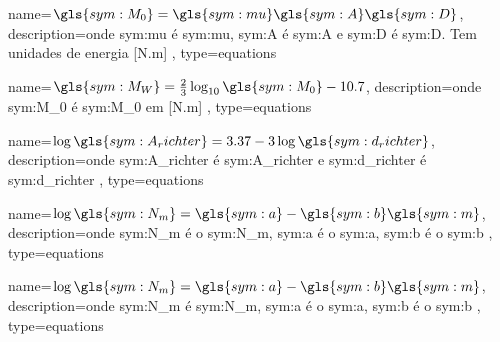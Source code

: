 
{
	name={\ensuremath{\gls{sym:M_0} = \gls{sym:mu}\gls{sym:A}\gls{sym:D}}},
	description={onde \gls{sym:mu} é \glsdesc{sym:mu}, 
				 \gls{sym:A} é \glsdesc{sym:A} e 
				 \gls{sym:D} é \glsdesc{sym:D}. 
				 Tem unidades de energia [N.m]
		 },
	type=equations
}

{
	name={\ensuremath{\gls{sym:M_W} = \frac{2}{3} \log_{10}{\gls{sym:M_0}} - 10.7 }},
	description={onde \gls{sym:M_0} é \glsdesc{sym:M_0} em [N.m]
		 },
	type=equations
}

{
	name={\ensuremath{\log{\gls{sym:A_richter}} = 3.37 - 3\log{\gls{sym:d_richter}}}},
	description={onde \gls{sym:A_richter} é \glsdesc{sym:A_richter} e 
					  \gls{sym:d_richter} é \glsdesc{sym:d_richter}
		 },
	type=equations
}

{
	name={\ensuremath{\log{\gls{sym:N_m}} = \gls{sym:a} - \gls{sym:b}\gls{sym:m} }},
	description={onde \gls{sym:N_m} é o \glsdesc{sym:N_m}, 
					  \gls{sym:a} é o \glsdesc{sym:a},
					  \gls{sym:b} é o \glsdesc{sym:b}
    },
	type=equations
}


{
	name={\ensuremath{\log{\gls{sym:N_m}} = \gls{sym:a} - \gls{sym:b}\gls{sym:m} }},
	description={onde \gls{sym:N_m} é \glsdesc{sym:N_m}, 
					  \gls{sym:a} é o \glsdesc{sym:a},
					  \gls{sym:b} é o \glsdesc{sym:b}
    },
	type=equations
}

